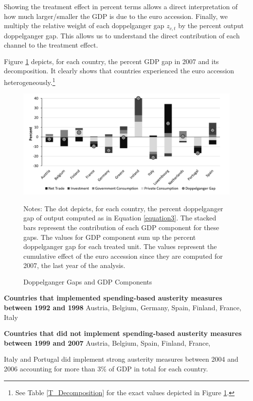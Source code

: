 \documentclass[12pt]{article}
\newcommand{\annote}[1]{\parbox{\textwidth}{\renewcommand{\baselinestretch}{1.0}\vspace{12pt} \small Notes: #1}}
\begin{document}
Showing the treatment effect in percent terms allows a direct interpretation of how much larger/smaller the GDP is due to the euro accession. Finally, we multiply the relative weight of each doppelganger gap $z_{c,t}$ by the percent output doppelganger gap. This allows us to understand the direct contribution of each channel to the treatment effect.

Figure \ref{F_Decomposition} depicts, for each country, the percent GDP gap in 2007 and its decomposition. It clearly shows that countries experienced the euro accession heterogeneously.\footnote{See Table \ref{T_Decomposition} for the exact values depicted in Figure \ref{F_Decomposition}.}  

\begin{figure}[h!]
    \centering
    \caption{Doppelganger Gaps and GDP Components}
    \includegraphics[scale=0.8]{Decomposition.jpg}
    \annote{The dot depicts, for each country, the percent  doppelganger gap of output computed as in Equation \ref{equation3}. The stacked bars represent the contribution of each GDP component for these gaps. The values for GDP component sum up the percent doppelganger gap for each treated unit. The values represent the cumulative effect of the euro accession since they are computed for 2007, the last year of the analysis.}
    \label{F_Decomposition}
\end{figure}

\textbf{Countries that implemented spending-based austerity measures between 1992 and 1998} Austria, Belgium, Germany, Spain, Finland, France, Italy

\textbf{Countries that did not implement spending-based austerity measures between 1999 and 2007} Austria, Belgium, Spain, Finland, France,

Italy and Portugal did implement strong austerity measures between 2004 and 2006 accounting for more than 3\% of GDP in total for each country.
\end{document}
